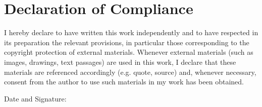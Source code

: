 \section*{Declaration of Compliance }

\vspace{1cm}

I hereby declare to have written this work independently and to have respected in its preparation the relevant provisions, in particular those corresponding to the copyright protection of external materials. Whenever external materials (such as images, drawings, text passages) are used in this work, I declare that these materials are referenced accordingly (e.g. quote, source) and, whenever necessary, consent from the author to use such materials in my work has been obtained.

\vspace{2cm}

Date and Signature: